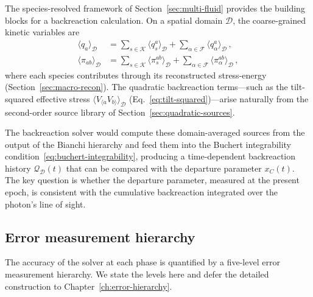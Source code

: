 The species-resolved framework of
Section~\ref{sec:multi-fluid} provides the building
blocks for a backreaction calculation.  On a spatial
domain $\mathcal{D}$, the coarse-grained kinetic
variables are
\begin{equation}\label{eq:coarse-variables}
\begin{aligned}
\langle q_a \rangle_{\mathcal{D}}
&= \sum_{s \in \mathcal{K}}
  \langle q_s^a \rangle_{\mathcal{D}}
+ \sum_{\alpha \in \mathcal{F}}
  \langle q_\alpha^a \rangle_{\mathcal{D}}\,,\\[4pt]
\langle \pi_{ab} \rangle_{\mathcal{D}}
&= \sum_{s \in \mathcal{K}}
  \langle \pi_s^{ab} \rangle_{\mathcal{D}}
+ \sum_{\alpha \in \mathcal{F}}
  \langle \pi_\alpha^{ab} \rangle_{\mathcal{D}}\,,
\end{aligned}
\end{equation}
where each species contributes through its reconstructed
stress-energy (Section~\ref{sec:macro-recon}).  The
quadratic backreaction terms---such as the tilt-squared
effective stress
$\langle V_{\langle a} V_{b\rangle} \rangle_{\mathcal{D}}$
(Eq.~\ref{eq:tilt-squared})---arise naturally from the
second-order source library of
Section~\ref{sec:quadratic-sources}.

The backreaction solver would compute these
domain-averaged sources from the output of the Bianchi
hierarchy and feed them into the Buchert integrability
condition~\eqref{eq:buchert-integrability}, producing a
time-dependent backreaction history
$\mathcal{Q}_{\mathcal{D}}(t)$ that can be compared with
the departure parameter $x_C(t)$.  The key question is
whether the departure parameter, measured at the present
epoch, is consistent with the cumulative backreaction
integrated over the photon's line of sight.


\subsection{Error measurement hierarchy}
\label{sec:error-hierarchy-preview}

The accuracy of the solver at each phase is quantified by
a five-level error measurement hierarchy.  We state the
levels here and defer the detailed construction to
Chapter~\ref{ch:error-hierarchy}.

